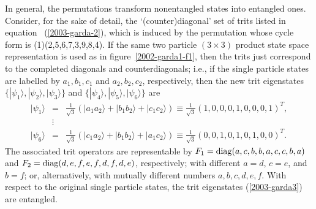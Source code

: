 \documentclass{article}
\begin{document}
In general, the permutations transform nonentangled states into entangled ones.
Consider, for the sake of detail, the `(counter)diagonal' set of trits
listed in equation~
(\ref{2003-garda-2}),
which is induced by the permutation
whose cycle form
is (1)(2,5,6,7,3,9,8,4).
If the same two particle $(3\times 3)$ product state space representation is used
as in figure~\ref{2002-garda1-f1},
then the trits just correspond to the completed diagonals and counterdiagonals; i.e., if the
single particle states are labelled by
$a_1,b_1,c_1$
and
$a_2,b_2,c_2$,
respectively, then the new trit eigenstates
$\{
|\psi_1\rangle ,
|\psi_2\rangle ,
|\psi_3\rangle \}$
and $\{
|\psi_4\rangle ,
|\psi_5\rangle ,
|\psi_6\rangle  \}$ are
\begin{equation}
\begin{array}{llllll}
 |\psi_1\rangle &=& \frac{1}{\sqrt{3}} \left(|a_1a_2\rangle + |b_1b_2\rangle+ |c_1c_2\rangle \right) \equiv \frac{1}{\sqrt{3}} \left(1,0,0,0,1,0,0,0,1\right)^T ,\\
&\vdots &\\
|\psi_6\rangle &=& \frac{1}{\sqrt{3}} \left(|c_1a_2\rangle + |b_1b_2\rangle+ |a_1c_2\rangle \right) \equiv \frac{1}{\sqrt{3}} \left(0,0,1,0,1,0,1,0,0\right)^T
.
\end{array}
\label{2003-garda3}
\end{equation}
The associated trit operators are representable by
$F_1 = {\rm diag} (a,c,b,b,a,c,c,b,a)$ and
$F_2 = {\rm diag} (d,e,f,e,f,d,f,d,e)$, respectively;
with different $a=d$, $c=e$, and $b=f$;
or, alternatively, with mutually different numbers $a,b,c,d,e,f$.
With respect to the original single particle states, the trit eigenstates
(\ref{2003-garda3}) are
entangled.
\end{document}
